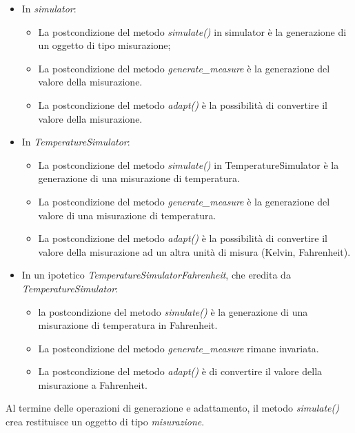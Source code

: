 \begin{itemize}
        \begin{itemize}
            \item In \textit{simulator}:
            \begin{itemize}
                \item La postcondizione del metodo \textit{simulate()} in simulator è la generazione di un oggetto di tipo misurazione;
                \item La postcondizione del metodo \textit{generate\_measure} è la generazione del valore della misurazione.
                \item La postcondizione del metodo \textit{adapt()} è la possibilità di convertire il valore della misurazione.
            \end{itemize}
            \item In \textit{TemperatureSimulator}:
            \begin{itemize}
                \item La postcondizione del metodo \textit{simulate()} in TemperatureSimulator è la generazione di una misurazione di temperatura.
                \item La postcondizione del metodo \textit{generate\_measure} è la generazione del valore di una misurazione di temperatura.
                \item La postcondizione del metodo \textit{adapt()} è la possibilità di convertire il valore della misurazione ad un altra unità di misura (Kelvin, Fahrenheit).
            \end{itemize}
            \item In un ipotetico \textit{TemperatureSimulatorFahrenheit}, che eredita da \textit{TemperatureSimulator}:
            \begin{itemize}
                \item la postcondizione del metodo \textit{simulate()} è la generazione di una misurazione di temperatura in Fahrenheit.
                \item La postcondizione del metodo \textit{generate\_measure} rimane invariata.
                \item La postcondizione del metodo \textit{adapt()} è di convertire il valore della misurazione a Fahrenheit.
            \end{itemize}
        \end{itemize}
 \end{itemize}

Al termine delle operazioni di generazione e adattamento, il metodo \textit{simulate()} crea restituisce un oggetto di tipo \textit{misurazione}.

